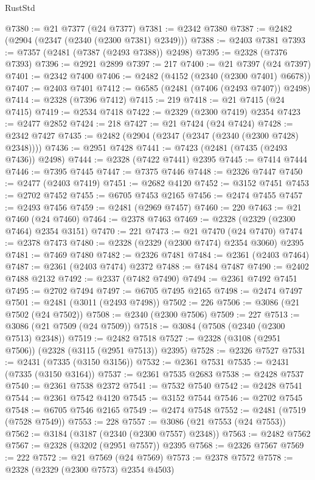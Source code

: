 \begin{lexlean}{RustStd}
\begin{coremodule}
{\begin{coremodule}
{{{{{{{{{{{{{{{{{{{{{{{{{{{{{{{{{{{{{@7380 := @21 @7377 (@24 @7377)
@7381 := @2342 @7380
@7387 := @2482 (@2904 (@2347 (@2340 (@2300 @7381) @2349)))
@7388 := @2403 @7381
@7393 := @7357 (@2481 (@7387 (@2493 @7388)) @2498)
@7395 := @2328 (@7376 @7393)
@7396 := @2921 @2899
@7397 := 217
@7400 := @21 @7397 (@24 @7397)
@7401 := @2342 @7400
@7406 := @2482 (@4152 (@2340 (@2300 @7401) @6678))
@7407 := @2403 @7401
@7412 := @6585 (@2481 (@7406 (@2493 @7407)) @2498)
@7414 := @2328 (@7396 @7412)
@7415 := 219
@7418 := @21 @7415 (@24 @7415)
@7419 := @2534 @7418
@7422 := @2329 (@2300 @7419) @2354
@7423 := @2477 @2852
@7424 := 218
@7427 := @21 @7424 (@24 @7424)
@7428 := @2342 @7427
@7435 := @2482 (@2904 (@2347 (@2347 (@2340 (@2300 @7428) @2348))))
@7436 := @2951 @7428
@7441 := @7423 (@2481 (@7435 (@2493 @7436)) @2498)
@7444 := @2328 (@7422 @7441) @2395
@7445 := @7414 @7444
@7446 := @7395 @7445
@7447 := @7375 @7446
@7448 := @2326 @7447
@7450 := @2477 (@2403 @7419)
@7451 := @2682 @4120
@7452 := @3152 @7451
@7453 := @2702 @7452
@7455 := @6705 @7453 @2165
@7456 := @2474 @7455
@7457 := @2493 @7456
@7459 := @2481 (@2969 @7457)
@7460 := 220
@7463 := @21 @7460 (@24 @7460)
@7464 := @2378 @7463
@7469 := @2328 (@2329 (@2300 @7464) @2354 @3151)
@7470 := 221
@7473 := @21 @7470 (@24 @7470)
@7474 := @2378 @7473
@7480 := @2328 (@2329 (@2300 @7474) @2354 @3060) @2395
@7481 := @7469 @7480
@7482 := @2326 @7481
@7484 := @2361 (@2403 @7464)
@7487 := @2361 (@2403 @7474) @2372
@7488 := @7484 @7487
@7490 := @2402 @7488 @2132
@7492 := @2337 (@7482 @7490)
@7494 := @2361 @7492 @7451
@7495 := @2702 @7494
@7497 := @6705 @7495 @2165
@7498 := @2474 @7497
@7501 := @2481 (@3011 (@2493 @7498))
@7502 := 226
@7506 := @3086 (@21 @7502 (@24 @7502))
@7508 := @2340 (@2300 @7506)
@7509 := 227
@7513 := @3086 (@21 @7509 (@24 @7509))
@7518 := @3084 (@7508 (@2340 (@2300 @7513) @2348))
@7519 := @2482 @7518
@7527 := @2328 (@3108 (@2951 @7506)) (@2328 (@3115 (@2951 @7513)) @2395)
@7528 := @2326 @7527
@7531 := @2431 (@7335 (@3150 @3156))
@7532 := @2361 @7531
@7535 := @2431 (@7335 (@3150 @3164))
@7537 := @2361 @7535 @2683
@7538 := @2428 @7537
@7540 := @2361 @7538 @2372
@7541 := @7532 @7540
@7542 := @2428 @7541
@7544 := @2361 @7542 @4120
@7545 := @3152 @7544
@7546 := @2702 @7545
@7548 := @6705 @7546 @2165
@7549 := @2474 @7548
@7552 := @2481 (@7519 (@7528 @7549))
@7553 := 228
@7557 := @3086 (@21 @7553 (@24 @7553))
@7562 := @3184 (@3187 (@2340 (@2300 @7557) @2348))
@7563 := @2482 @7562
@7567 := @2328 (@3202 (@2951 @7557)) @2395
@7568 := @2326 @7567
@7569 := 222
@7572 := @21 @7569 (@24 @7569)
@7573 := @2378 @7572
@7578 := @2328 (@2329 (@2300 @7573) @2354 @4503)
}}}}}}}}}}}}}}}}}}}}}}}}}}}}}}}}}}}}}
\end{coremodule}}
\end{coremodule}
\end{lexlean}

